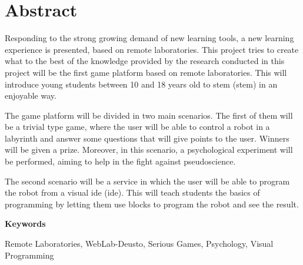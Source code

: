 \chapter*{Abstract}

Responding to the strong growing demand of new learning tools, a new learning experience is
presented, based on remote laboratories. This project tries to create what to the best of the
knowledge provided by the research conducted in this project will be the first game platform based
on remote laboratories. This will introduce young students between 10 and 18 years old to
\acrshort{stem} (\acrlong{stem}) in an enjoyable way.

The game platform will be divided in two main scenarios. The first of them will be a trivial type
game, where the user will be able to control a robot in a labyrinth and answer some questions that
will give points to the user. Winners will be given a prize. Moreover, in this scenario, a
psychological experiment will be performed, aiming to help in the fight against pseudoscience.

The second scenario will be a service in which the user will be able to program the robot from a
visual \acrshort{ide} (\acrlong{ide}). This will teach students the basics of programming by letting
them use blocks to program the robot and see the result.

\vspace{2em}

{\Large\bfseries\sffamily Keywords}
\vspace{3\medskipamount}

Remote Laboratories, WebLab-Deusto, Serious Games, Psychology, Visual Programming
